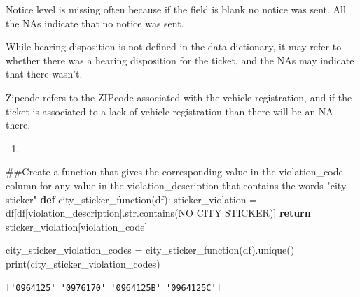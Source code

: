 \documentclass[
]{article}
\newenvironment{Shaded}{\begin{snugshade}}{\end{snugshade}}
\newcommand{\BuiltInTok}[1]{\textcolor[rgb]{0.00,0.23,0.31}{#1}}
\newcommand{\CommentTok}[1]{\textcolor[rgb]{0.37,0.37,0.37}{#1}}
\newcommand{\ControlFlowTok}[1]{\textcolor[rgb]{0.00,0.23,0.31}{\textbf{#1}}}
\newcommand{\KeywordTok}[1]{\textcolor[rgb]{0.00,0.23,0.31}{\textbf{#1}}}
\newcommand{\NormalTok}[1]{\textcolor[rgb]{0.00,0.23,0.31}{#1}}
\newcommand{\OperatorTok}[1]{\textcolor[rgb]{0.37,0.37,0.37}{#1}}
\newcommand{\StringTok}[1]{\textcolor[rgb]{0.13,0.47,0.30}{#1}}
\providecommand{\tightlist}{%
  \setlength{\itemsep}{0pt}\setlength{\parskip}{0pt}}\usepackage{longtable,booktabs,array}
\begin{document}
Notice level is missing often because if the field is blank no notice
was sent. All the NAs indicate that no notice was sent.

While hearing disposition is not defined in the data dictionary, it may
refer to whether there was a hearing disposition for the ticket, and the
NAs may indicate that there wasn't.

Zipcode refers to the ZIPcode associated with the vehicle registration,
and if the ticket is associated to a lack of vehicle registration than
there will be an NA there.

\begin{enumerate}
\def\labelenumi{\arabic{enumi}.}
\setcounter{enumi}{2}
\tightlist
\item
\end{enumerate}

\begin{Shaded}
\begin{Highlighting}[]
\CommentTok{\#\#Create a function that gives the corresponding value in the \textquotesingle{}violation\_code\textquotesingle{} column for any value in the \textquotesingle{}violation\_description\textquotesingle{} that contains the words "city sticker"}
\KeywordTok{def}\NormalTok{ city\_sticker\_function(df):}
\NormalTok{    sticker\_violation }\OperatorTok{=}\NormalTok{ df[df[}\StringTok{\textquotesingle{}violation\_description\textquotesingle{}}\NormalTok{].}\BuiltInTok{str}\NormalTok{.contains(}\StringTok{\textquotesingle{}NO CITY STICKER\textquotesingle{}}\NormalTok{)]}
    \ControlFlowTok{return}\NormalTok{ sticker\_violation[}\StringTok{\textquotesingle{}violation\_code\textquotesingle{}}\NormalTok{]}

\NormalTok{city\_sticker\_violation\_codes }\OperatorTok{=}\NormalTok{ city\_sticker\_function(df).unique()}
\BuiltInTok{print}\NormalTok{(city\_sticker\_violation\_codes)}
\end{Highlighting}
\end{Shaded}

\begin{verbatim}
['0964125' '0976170' '0964125B' '0964125C']
\end{verbatim}
\end{document}
